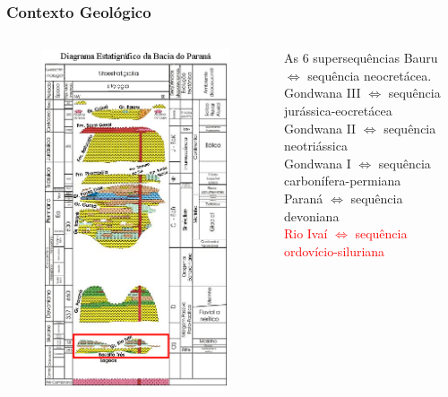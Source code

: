 \documentclass[aspectratio=10]{beamer} %
\begin{document}
\begin{frame}
\frametitle{Contexto Geológico}
\begin{columns}
\begin{column}{0.4\textwidth}
\begin{figure}
\includegraphics[scale=0.36]{Imagens/diagramarioivai.png}
\end{figure}
\end{column}
\begin{column}{0.75\textwidth}
\begin{block}{As $6$ supersequências}
Bauru $\Longleftrightarrow$  sequência neocretácea.\\
Gondwana III $\Longleftrightarrow$ sequência jurássica-eocretácea\\
Gondwana II $\Longleftrightarrow$ sequência neotriássica \\
Gondwana I $\Longleftrightarrow$ sequência carbonífera-permiana\\ 
Paraná $\Longleftrightarrow$ sequência devoniana\\
\textcolor{red}{Rio Ivaí $\Longleftrightarrow$ sequência ordovício-siluriana}\\
\cite{Vail_1977,assine_1994,milani_orogenias_1998}
\end{block}
\end{column}
\end{columns}
\end{frame}
\end{document}
